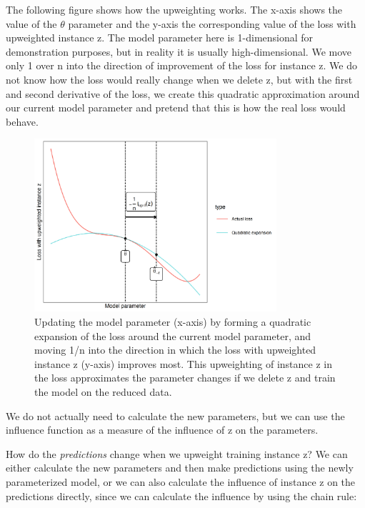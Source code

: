 \documentclass[
  11pt,
]{scrbook}
\begin{document}
The following figure shows how the upweighting works.
The x-axis shows the value of the \(\theta\) parameter and the y-axis the corresponding value of the loss with upweighted instance z.
The model parameter here is 1-dimensional for demonstration purposes, but in reality it is usually high-dimensional.
We move only 1 over n into the direction of improvement of the loss for instance z.
We do not know how the loss would really change when we delete z, but with the first and second derivative of the loss, we create this quadratic approximation around our current model parameter and pretend that this is how the real loss would behave.

\begin{figure}

{\centering \includegraphics[width=0.8\textwidth]{images/quadratic-expansion-1} 

}

\caption{Updating the model parameter (x-axis) by forming a quadratic expansion of the loss around the current model parameter, and moving 1/n into the direction in which the loss with upweighted instance z (y-axis) improves most. This upweighting of instance z in the loss approximates the parameter changes if we delete z and train the model on the reduced data.}\label{fig:quadratic-expansion}
\end{figure}

We do not actually need to calculate the new parameters, but we can use the influence function as a measure of the influence of z on the parameters.

How do the \emph{predictions} change when we upweight training instance z?
We can either calculate the new parameters and then make predictions using the newly parameterized model, or we can also calculate the influence of instance z on the predictions directly, since we can calculate the influence by using the chain rule:
\end{document}
